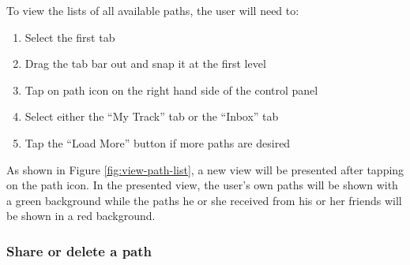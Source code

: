 \documentclass[12pt,a4paper]{article}
\begin{document}
            To view the lists of all available paths, the user will need to:
            \begin{enumerate}
                \item Select the first tab
                \item Drag the tab bar out and snap it at the first level
                \item Tap on path icon on the right hand side of the control panel
                \item Select either the ``My Track'' tab or the ``Inbox'' tab
                \item Tap the ``Load More'' button if more paths are desired
            \end{enumerate}
            As shown in Figure \ref{fig:view-path-list}, a new view will be presented after tapping on the path icon. In the presented view, the user's own paths will be shown with a green background while the paths he or she received from his or her friends will be shown in a red background.
            
            \subsubsection{Share or delete a path}
            
\end{document}
